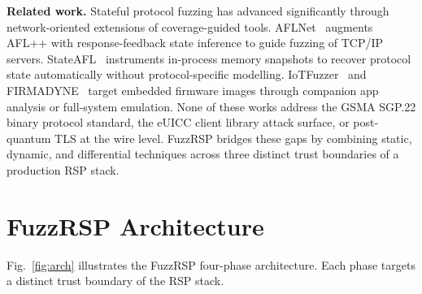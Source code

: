 \documentclass[final,3p,times,twocolumn]{elsarticle}
\begin{document}
\textbf{Related work.}
Stateful protocol fuzzing has advanced significantly through network-oriented
extensions of coverage-guided tools.
AFLNet~\cite{pham2020aflnet} augments AFL++ with response-feedback state
inference to guide fuzzing of TCP/IP servers.
StateAFL~\cite{natella2022stateafl} instruments in-process memory snapshots to
recover protocol state automatically without protocol-specific modelling.
IoTFuzzer~\cite{firmfuzz} and FIRMADYNE~\cite{chen2016towards} target embedded
firmware images through companion app analysis or full-system emulation.
None of these works address the GSMA SGP.22 binary protocol standard, the
eUICC client library attack surface, or post-quantum TLS at the wire level.
FuzzRSP bridges these gaps by combining static, dynamic, and differential
techniques across three distinct trust boundaries of a production RSP stack.

\section{FuzzRSP Architecture}\label{sec:design}

Fig.~\ref{fig:arch} illustrates the FuzzRSP four-phase architecture.
Each phase targets a distinct trust boundary of the RSP stack.
\end{document}
